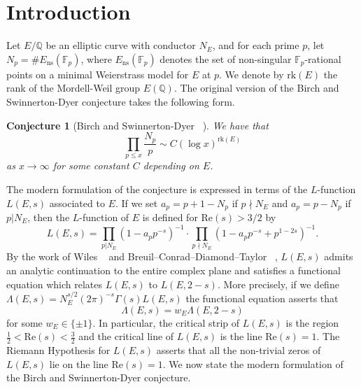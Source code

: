 \documentclass[12pt,reqno]{amsart}
\newtheorem{conjecture}[theorem]{Conjecture}
\theoremstyle{definition}
\numberwithin{equation}{section}
\newcommand{\rk}{\mathrm{rk}}
\renewcommand{\Re}{\mathrm{Re}}
\begin{document}
\section{Introduction}\label{Introduction}%

 Let $E/\mathbb Q$ be an elliptic curve with conductor $N_E$, and for each prime $p$, let $N_p=\#E_{\textrm{ns}}(\mathbb F_p)$, where $E_{\textrm{ns}}(\mathbb F_p)$ denotes the set of non-singular $\mathbb F_p$-rational points on a minimal Weierstrass model for $E$ at $p$.  We denote by $\rk(E)$ the rank of the Mordell-Weil group $E(\mathbb Q)$. The original version of the Birch and Swinnerton-Dyer conjecture takes the following form. 

\begin{conjecture} [Birch and Swinnerton-Dyer ~\cite{BirchSwinnertonDyer1965}]  \label{OBSD}
We have that $$\prod_{p \leq x} \frac{N_p}{p}  \sim C (\log x)^{\rk (E) }$$ as $x \to \infty$ for some constant $C$ depending on $E$. 
\end{conjecture}

The modern formulation of the conjecture is expressed in terms of the $L$-function $L(E, s)$ associated to $E$.  If we set $a_p=p+1-N_p$ if $p \nmid N_E$ and $a_p=p-N_p$ if $p |N_E$, then the $L$-function of $E$ is defined for $\textrm{Re}(s)>3/2$ by 
$$
L(E, s)= \prod_{p |N_E} (1-a_p p^{-s})^{-1} \cdot   \prod_{p \nmid N_E} (1-a_p p^{-s}+p^{1-2s})^{-1}. 
$$
By the work of Wiles ~\cite{Wiles1995} and Breuil--Conrad--Diamond--Taylor ~\cite{BreuilConradDiamondTaylor2001},  $L(E, s)$ admits an analytic continuation to the entire complex plane and satisfies a functional equation which relates $L(E, s)$ to $L(E, 2-s)$. More precisely,  if we define 
$
\Lambda(E, s) = N_E^{s/2} (2 \pi)^{-s} \Gamma(s) L(E, s)
$
the functional equation asserts that 
\begin{equation} \label{func}
\Lambda(E, s) = w_E \Lambda(E, 2-s) 
\end{equation}
for some $w_E \in \{\pm 1\}$. 
In particular, the critical strip of $L(E, s)$ is the region $\frac{1}{2}< \Re(s)< \frac{3}{2}$ and the critical line of $L(E, s)$ is the line $\Re(s)=1$. The Riemann Hypothesis for $L(E, s)$ asserts that all the non-trivial zeros of $L(E, s)$ lie on the line $\textrm{Re}(s)=1$.   We now state the modern formulation of the Birch and Swinnerton-Dyer conjecture. 
\end{document}
